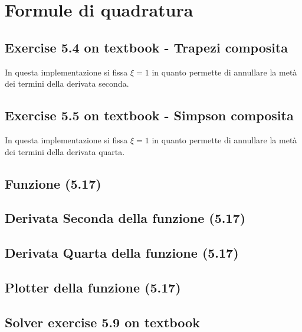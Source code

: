 \section{Formule di quadratura}

\subsection{Exercise 5.4 on textbook - Trapezi composita}
\label{subsec:exercise54}
 
In questa implementazione si fissa $\xi = 1$ in quanto permette di annullare la
met\`a dei termini della derivata seconda.

\subsection{Exercise 5.5 on textbook - Simpson composita}
\label{subsec:exercise55}

In questa implementazione si fissa $\xi = 1$ in quanto permette di annullare la
met\`a dei termini della derivata quarta.

\subsection{Funzione (5.17)}
\label{subsec:function517}


\subsection{Derivata Seconda della funzione (5.17)}
\label{subsec:secondDer517}


\subsection{Derivata Quarta della funzione (5.17)}
\label{subsec:fourthDer517}


\subsection{Plotter della funzione (5.17)}
\label{subsec:functionPlotter517}


\subsection{Solver exercise 5.9 on textbook}
\label{subsec:exercise59solver}
